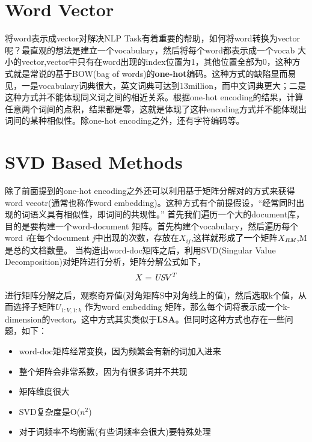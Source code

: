\documentclass[twoside,nofonts,fancyhdr,openany,UTF8]{ctexbook}
\begin{document}
\section{Word Vector}
将word表示成vector对解决NLP Task有着重要的帮助，如何将word转换为vector呢？最直观的想法是建立一个vocabulary，然后将每个word都表示成一个vocab 大小的vector,vector中只有在word出现的index位置为1，其他位置全部为0，这种方式就是常说的基于BOW(bag of words)的\textbf{one-hot}编码。这种方式的缺陷显而易见，一是vocabulary词典很大，英文词典可达到13million，而中文词典更大；二是这种方式并不能体现同义词之间的相近关系。根据one-hot encoding的结果，计算任意两个词间的点积，结果都是零，这就是体现了这种encoding方式并不能体现出词间的某种相似性。除one-hot encoding之外，还有字符编码等。

\section{SVD Based Methods}
除了前面提到的one-hot encoding之外还可以利用基于矩阵分解对的方式来获得word vecotr(通常也称作word embedding)。这种方式有个前提假设，“经常同时出现的词语义具有相似性，即词间的共现性。” 首先我们遍历一个大的document库，目的是要构建一个word-document 矩阵。首先构建个vocabulary，然后遍历每个word \emph{i}在每个document \emph{j}中出现的次数，存放在$X_{ij}$,这样就形成了一个矩阵$X_{\emph{R}\emph{M}}$,M是总的文档数量。
当构造出word-doc矩阵之后，利用SVD(Singular Value Decomposition)对矩阵进行分析，矩阵分解公式如下，
\begin{equation}
X = \emph{US$V^T$}
\end{equation}
进行矩阵分解之后，观察奇异值(对角矩阵S中对角线上的值)，然后选取k个值，从而选择子矩阵$U_{1:V, 1:k}$ 作为word embedding 矩阵，那么每个词将表示成一个k-dimension的vector。这中方式其实类似于\textbf{LSA}。但同时这种方式也存在一些问题，如下：

\begin{itemize}
\item word-doc矩阵经常变换，因为频繁会有新的词加入进来
\item 整个矩阵会非常系数，因为有很多词并不共现
\item 矩阵维度很大
\item SVD复杂度是O($n^2$)
\item 对于词频率不均衡需(有些词频率会很大)要特殊处理
\end{itemize}
\end{document}
